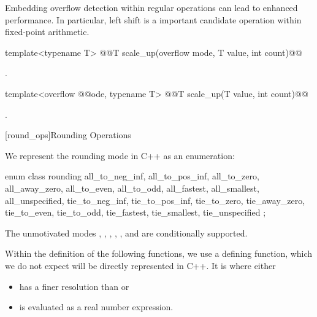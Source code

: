\begin{addedblock}
Embedding overflow detection within regular operations can lead to enhanced performance. In particular, left shift is a important candidate operation within fixed-point arithmetic.

\begin{itemdecl}
template<typename T> @@T scale_up(overflow mode, T value, int count)@\addmodif{;}@
\end{itemdecl}

\begin{itemdescr}
\returns {}.	
\end{itemdescr}

\begin{itemdecl}
template<overflow @@ode, typename T> @@T scale_up(T value, int count)@\addmodif{;}@
\end{itemdecl}

\begin{itemdescr}
\returns {}.	
\end{itemdescr}

[round_ops]{Rounding Operations}

We represent the rounding mode in C++ as an enumeration:

\begin{codeblock}
enum class rounding {
  all_to_neg_inf, all_to_pos_inf,
  all_to_zero, all_away_zero,
  all_to_even, all_to_odd,
  all_fastest, all_smallest,
  all_unspecified,
  tie_to_neg_inf, tie_to_pos_inf,
  tie_to_zero, tie_away_zero,
  tie_to_even, tie_to_odd,
  tie_fastest, tie_smallest,
  tie_unspecified
};
\end{codeblock}

The unmotivated modes , , , , , and  are conditionally supported.

Within the definition of the following functions, we use a defining function, which we do not expect will be directly represented in C++. It is  where  either

\begin{itemize}
\item has a finer resolution than  or
\item is evaluated as a real number expression.
\end{itemize}


\end{addedblock}
